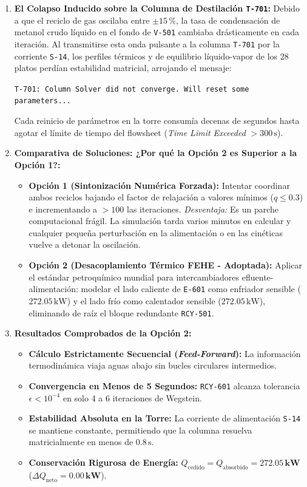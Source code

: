 \documentclass[11pt,a4paper]{article}
\begin{document}
\begin{enumerate}
    \item \textbf{El Colapso Inducido sobre la Columna de Destilación \texttt{T-701}:}  
    Debido a que el reciclo de gas oscilaba entre $\pm 15\,\%$, la tasa de condensación de metanol crudo líquido en el fondo de \texttt{V-501} cambiaba drásticamente en cada iteración. Al transmitirse esta onda pulsante a la columna \texttt{T-701} por la corriente \texttt{S-14}, los perfiles térmicos y de equilibrio líquido-vapor de los 28 platos perdían estabilidad matricial, arrojando el mensaje:
    \begin{center}
        \texttt{T-701: Column Solver did not converge. Will reset some parameters...}
    \end{center}
    Cada reinicio de parámetros en la torre consumía decenas de segundos hasta agotar el límite de tiempo del flowsheet (\textit{Time Limit Exceeded} $>300\,\text{s}$).

    \item \textbf{Comparativa de Soluciones: ¿Por qué la Opción 2 es Superior a la Opción 1?:}  
    \begin{itemize}
        \item \textbf{Opción 1 (Sintonización Numérica Forzada):} Intentar coordinar ambos reciclos bajando el factor de relajación a valores mínimos ($q \le 0.3$) e incrementando a $>100$ las iteraciones. \textit{Desventaja:} Es un parche computacional frágil. La simulación tarda varios minutos en calcular y cualquier pequeña perturbación en la alimentación o en las cinéticas vuelve a detonar la oscilación.
        \item \textbf{Opción 2 (Desacoplamiento Térmico FEHE - Adoptada):} Aplicar el estándar petroquímico mundial para intercambiadores efluente-alimentación: modelar el lado caliente de \texttt{E-601} como enfriador sensible ($272.05\,\text{kW}$) y el lado frío como calentador sensible ($272.05\,\text{kW}$), eliminando de raíz el bloque redundante \texttt{RCY-501}.
    \end{itemize}

    \item \textbf{Resultados Comprobados de la Opción 2:}
    \begin{itemize}
        \item \textbf{Cálculo Estrictamente Secuencial (\textit{Feed-Forward}):} La información termodinámica viaja aguas abajo sin bucles circulares intermedios.
        \item \textbf{Convergencia en Menos de 5 Segundos:} \texttt{RCY-601} alcanza tolerancia $\epsilon < 10^{-4}$ en solo 4 a 6 iteraciones de Wegstein.
        \item \textbf{Estabilidad Absoluta en la Torre:} La corriente de alimentación \texttt{S-14} se mantiene constante, permitiendo que la columna resuelva matricialmente en menos de $0.8\,\text{s}$.
        \item \textbf{Conservación Rigurosa de Energía:} $Q_{\text{cedido}} = Q_{\text{absorbido}} = \mathbf{272.05\,\text{kW}}$ ($\Delta Q_{\text{neto}} = \mathbf{0.00\,\text{kW}}$).
    \end{itemize}
\end{enumerate}
\end{document}
